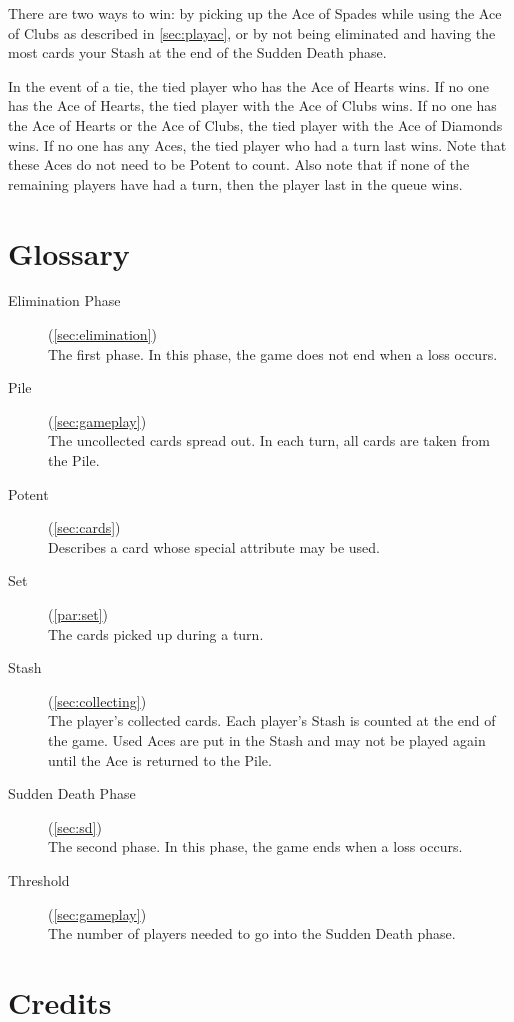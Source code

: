 \documentclass{article}
\begin{document}
There are two ways to win: by picking up the Ace of Spades while using
the Ace of Clubs as described in \ref{sec:playac}, or by not being
eliminated and having the most cards your Stash at the end of the Sudden
Death phase.

In the event of a tie, the tied player who has the Ace of Hearts wins.
If no one has the Ace of Hearts, the tied player with the Ace of Clubs
wins. If no one has the Ace of Hearts or the Ace of Clubs, the tied
player with the Ace of Diamonds wins. If no one has any Aces, the tied
player who had a turn last wins. Note that these Aces do not need to be
Potent to count. Also note that if none of the remaining players have
had a turn, then the player last in the queue wins.

\section{Glossary}
\begin{description}
  \item[Elimination Phase](\ref{sec:elimination})\\
    The first phase. In this phase, the game does not end when a loss
    occurs.
  \item[Pile](\ref{sec:gameplay})\\
    The uncollected cards spread out. In each turn, all cards are taken
    from the Pile.
  \item[Potent](\ref{sec:cards})\\
    Describes a card whose special attribute may be used.
  \item[Set](\ref{par:set})\\
    The cards picked up during a turn.
  \item[Stash](\ref{sec:collecting})\\
    The player's collected cards. Each player's Stash is
    counted at the end of the game. Used Aces are put in the Stash and
    may not be played again until the Ace is returned to the Pile.
  \item[Sudden Death Phase](\ref{sec:sd})\\
    The second phase. In this phase, the game ends when a loss occurs.
  \item[Threshold](\ref{sec:gameplay})\\
    The number of players needed to go into the Sudden
    Death phase.
\end{description}

\newpage
\section{Credits}
\end{document}
